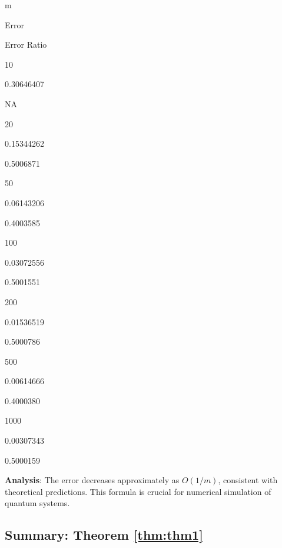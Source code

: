 \documentclass[
]{book}
\theoremstyle{definition}
\theoremstyle{definition}
\theoremstyle{definition}
\theoremstyle{definition}
\theoremstyle{remark}
\begin{document}
m

Error

Error Ratio

10

0.30646407

NA

20

0.15344262

0.5006871

50

0.06143206

0.4003585

100

0.03072556

0.5001551

200

0.01536519

0.5000786

500

0.00614666

0.4000380

1000

0.00307343

0.5000159

\textbf{Analysis}: The error decreases approximately as \(O(1/m)\), consistent with theoretical predictions. This formula is crucial for numerical simulation of quantum systems.

\subsection{Summary: Theorem \ref{thm:thm1}}\label{summary-theorem-refthmthm1}
\end{document}
